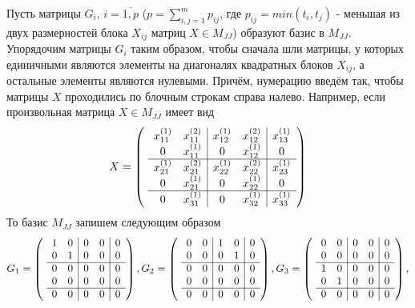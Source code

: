 \documentclass[11pt, a4paper]{article}
\begin{document}
Пусть матрицы $G_i$, $i=\overline{1,p}$ ($p = \displaystyle\sum_{i,j=1}^{m}p_{ij}$, где $p_{ij}=min(t_i, t_j)$ - меньшая из двух размерностей блока $X_{ij}$
матриц $X \in M_{JJ}$)
образуют базис в $M_{JJ}$. Упорядочим матрицы $G_i$ таким образом, чтобы сначала шли матрицы,
у которых единичными являются элементы на диагоналях квадратных блоков $X_{ij}$, а остальные элементы являются
нулевыми. Причём, нумерацию введём так, чтобы матрицы $X$ проходились по блочным строкам справа налево. Например, 
если произвольная матрица $X \in M_{JJ}$ имеет вид
$$X =
\left(\
    \begin{array}{c c | c c | c}
        x_{11}^{(1)} & x_{11}^{(2)} & x_{12}^{(1)} & x_{12}^{(2)} & x_{13}^{(1)} \\
        0 & x_{11}^{(1)} & 0 & x_{12}^{(1)} & 0 \\
        \hline
        x_{21}^{(1)} & x_{21}^{(2)} & x_{22}^{(1)} & x_{22}^{(2)} & x_{23}^{(1)} \\
        0 & x_{21}^{(1)} & 0 & x_{22}^{(1)} & 0 \\
        \hline
        0 & x_{31}^{(1)} & 0 & x_{32}^{(1)} & x_{33}^{(1)} \\
    \end{array}
\right)
$$
То базис $M_{JJ}$ запишем следующим образом
$$G_1 =
\left(\
    \begin{array}{c c | c c | c}
        1 & 0 & 0 & 0 & 0 \\
        0 & 1 & 0 & 0 & 0  \\
        \hline
        0 & 0 & 0 & 0 & 0 \\
        0 & 0 & 0 & 0 & 0\\
        \hline
        0 & 0 & 0 & 0 & 0 \\
    \end{array}
\right),
G_2 =
\left(\
    \begin{array}{c c | c c | c}
        0 & 0 & 1 & 0 & 0 \\
        0 & 0 & 0 & 1 & 0  \\
        \hline
        0 & 0 & 0 & 0 & 0 \\
        0 & 0 & 0 & 0 & 0\\
        \hline
        0 & 0 & 0 & 0 & 0 \\
    \end{array}
\right),
G_3 =
\left(\
    \begin{array}{c c | c c | c}
        0 & 0 & 0 & 0 & 0 \\
        0 & 0 & 0 & 0 & 0  \\
        \hline
        1 & 0 & 0 & 0 & 0 \\
        0 & 1 & 0 & 0 & 0\\
        \hline
        0 & 0 & 0 & 0 & 0 \\
    \end{array}
\right),
$$
\end{document}
